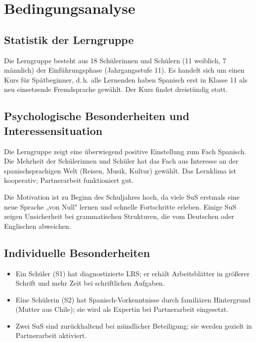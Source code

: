 \documentclass[11pt, a4paper]{article}
\begin{document}
\newpage


\tableofcontents
\newpage


\section{Bedingungsanalyse}

\subsection{Statistik der Lerngruppe}

Die Lerngruppe besteht aus 18 Schülerinnen und Schülern (11 weiblich, 7 männlich) der Einführungsphase (Jahrgangsstufe 11). Es handelt sich um einen Kurs für Spätbeginner, d.\,h. alle Lernenden haben Spanisch erst in Klasse 11 als neu einsetzende Fremdsprache gewählt. Der Kurs findet dreistündig statt.

\subsection{Psychologische Besonderheiten und Interessensituation}

Die Lerngruppe zeigt eine überwiegend positive Einstellung zum Fach Spanisch. Die Mehrheit der Schülerinnen und Schüler hat das Fach aus Interesse an der spanischsprachigen Welt (Reisen, Musik, Kultur) gewählt. Das Lernklima ist kooperativ; Partnerarbeit funktioniert gut.

Die Motivation ist zu Beginn des Schuljahres hoch, da viele SuS erstmals eine neue Sprache „von Null" lernen und schnelle Fortschritte erleben. Einige SuS zeigen Unsicherheit bei grammatischen Strukturen, die vom Deutschen oder Englischen abweichen.

\subsection{Individuelle Besonderheiten}

\begin{itemize}[leftmargin=2em]
    \item Ein Schüler (S1) hat diagnostizierte LRS; er erhält Arbeitsblätter in größerer Schrift und mehr Zeit bei schriftlichen Aufgaben.
    \item Eine Schülerin (S2) hat Spanisch-Vorkenntnisse durch familiären Hintergrund (Mutter aus Chile); sie wird als Expertin bei Partnerarbeit eingesetzt.
    \item Zwei SuS sind zurückhaltend bei mündlicher Beteiligung; sie werden gezielt in Partnerarbeit aktiviert.
\end{itemize}
\end{document}
